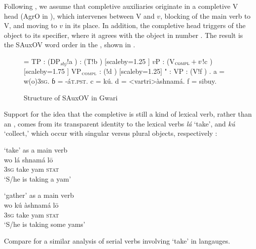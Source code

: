 \documentclass[output=paper,newtxmath,modfonts,nonflat,draftmode]{langsci/langscibook}
\begin{document}
\newpage 
Following \citet{kandy03}, we assume that completive auxiliaries originate in a completive V head (AgrO in \citet{kandy03}), which intervenes between V and $v$, blocking  of the main verb to V, and moving to $v$ in its place. In addition, the completive head triggers  of the object to its specifier, where it agrees with the object in number . The result is the SAuxOV word order in the , shown in .

\begin{figure}
{\scriptsize \jtree[xunit=2.5em,yunit=1.25em]
\! = {TP}
: ({DP$_{sbj}$}!a ) 
: ({T}!b ) [scaleby=1.25 ] {$v$P}
: ({V$_\textsc{compl}+v$}!c ) [scaleby=1.75 ] {VP$_\textsc{compl}$}
: ({}!d ) [scaleby=1.25] 
"{} : {} {VP}
: ({V}!f ) {\sout{}}.
\!a = {w(o)}{\textsc{3sg}}.
ɓ = {-á}{\textsc{t.pst}}.
\!c = {kú}{}.
\!d = <vartri>{àshnamá}{}.
\!f = {si}{buy}.
\endjtree}
\vspace{1.75em}
\caption{Structure of SAuxOV in Gwari}
\label{fig:sande:Gwari-OV}
\end{figure}

Support for the idea that the completive is still a kind of lexical verb, rather than an , comes from its transparent identity to the lexical verbs \textit{lá} `take', and \textit{kú} `collect,' which occur with singular versus plural objects, respectively \citep[63]{hyman1970}:

\ea \label{ex:Gwari-takecollect}

\ea \label{ex:Gwari-take} { `take' as a main verb}	\\
\gll wo lá shnamá l\=o \\
3\textsc{sg} take yam \textsc{stat} \\
\glt `S/he is taking a yam' \hfill \citep[][92]{hyman1970}

\ex \label{ex:Gwari-gather} { `gather' as a main verb}	\\
\gll wo kú àshnamá l{\=o}\\
3\textsc{sg} take yam \textsc{stat}\\
\glt `S/he is taking some yams' \hfill \citep[][93]{hyman1970}
\z
\z

Compare \citet{aboh09} for a similar analysis of serial verbs involving `take' in  langauges.
\end{document}
